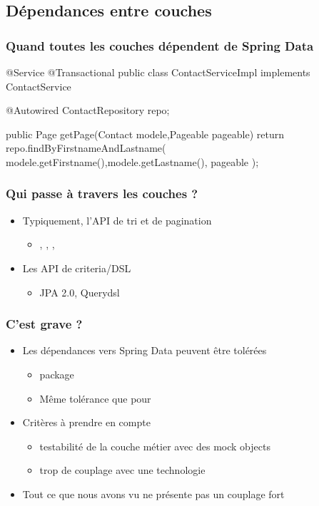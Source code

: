\subsection{Dépendances entre couches}


\begin{frame}[fragile]
 \frametitle{Quand toutes les couches dépendent de Spring Data}

 \begin{javacode}
@Service
@Transactional
public class ContactServiceImpl implements ContactService {
 
  @Autowired ContactRepository repo;
  
  public Page getPage(Contact modele,Pageable pageable) {
    return repo.findByFirstnameAndLastname(
      modele.getFirstname(),modele.getLastname(),
      pageable
    );
  }

}
 \end{javacode}
\end{frame}

\begin{frame}
 \frametitle{Qui passe à travers les couches ?}

 \begin{itemize}
  \item Typiquement, l'API de tri et de pagination
  \begin{itemize}
   \item {}, , , 
  \end{itemize}
  \item Les API de criteria/DSL
  \begin{itemize}
   \item JPA 2.0, Querydsl
  \end{itemize}
 \end{itemize}
 
\end{frame}

\begin{frame}
 \frametitle{C'est grave ?}

 \begin{itemize}
  \item Les dépendances vers Spring Data peuvent être tolérées
  \begin{itemize}
   \item package 
   \item Même tolérance que pour 
  \end{itemize}
  \item Critères à prendre en compte 
  \begin{itemize}
   \item testabilité de la couche métier avec des mock objects
   \item trop de couplage avec une technologie
  \end{itemize}
  \item Tout ce que nous avons vu ne présente pas un couplage fort
 \end{itemize}
 
\end{frame}